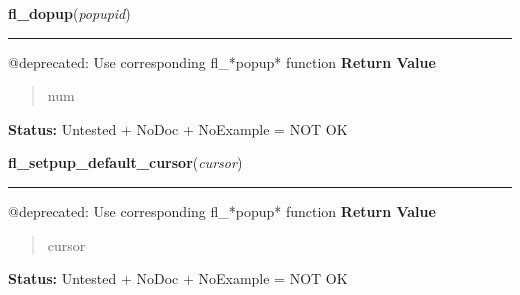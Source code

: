     \vspace{0.5ex}

\hspace{.8\funcindent}\begin{boxedminipage}{\funcwidth}

    \raggedright \textbf{fl\_dopup}(\textit{popupid})

    \vspace{-1.5ex}

    \rule{\textwidth}{0.5\fboxrule}
\setlength{\parskip}{2ex}

@deprecated: Use corresponding fl\_*popup* function
\setlength{\parskip}{1ex}
      \textbf{Return Value}
    \vspace{-1ex}

      \begin{quote}

num
      \end{quote}

\textbf{Status:} 
Untested + NoDoc + NoExample = NOT OK


    \end{boxedminipage}

    \label{xformslib:deprecated:fl_setpup_default_cursor}

    \vspace{0.5ex}

\hspace{.8\funcindent}\begin{boxedminipage}{\funcwidth}

    \raggedright \textbf{fl\_setpup\_default\_cursor}(\textit{cursor})

    \vspace{-1.5ex}

    \rule{\textwidth}{0.5\fboxrule}
\setlength{\parskip}{2ex}

@deprecated: Use corresponding fl\_*popup* function
\setlength{\parskip}{1ex}
      \textbf{Return Value}
    \vspace{-1ex}

      \begin{quote}

cursor
      \end{quote}

\textbf{Status:} 
Untested + NoDoc + NoExample = NOT OK


    \end{boxedminipage}

